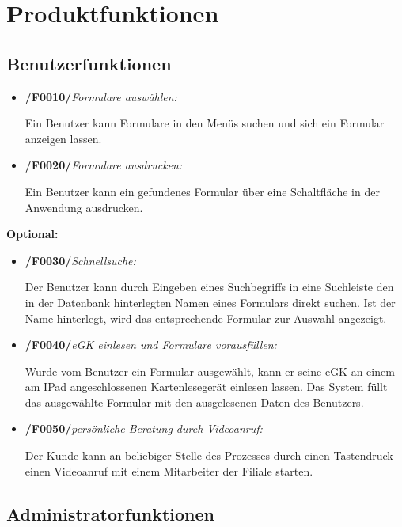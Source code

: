 \section{Produktfunktionen}


\subsection{Benutzerfunktionen}

\begin{itemize}
    \item \textbf{/F0010/}\textit{Formulare auswählen:} \par
    Ein Benutzer kann Formulare in den Menüs suchen und sich ein Formular anzeigen lassen.
    \item \textbf{/F0020/}\textit{Formulare ausdrucken:} \par
    Ein Benutzer kann ein gefundenes Formular über eine Schaltfläche in der Anwendung ausdrucken.
\end{itemize}
\vspace{1,5cm}
\textbf{Optional:}
    \begin{itemize}
        \item \textbf{/F0030/}\textit{Schnellsuche:} \par
        Der Benutzer kann durch Eingeben eines Suchbegriffs in eine Suchleiste den in der Datenbank hinterlegten Namen eines Formulars direkt suchen. Ist der Name hinterlegt, wird das entsprechende Formular zur Auswahl angezeigt.
        \item \textbf{/F0040/}\textit{eGK einlesen und Formulare vorausfüllen:} \par
        Wurde vom Benutzer ein Formular ausgewählt, kann er seine eGK an einem am IPad angeschlossenen Kartenlesegerät einlesen lassen. Das System füllt das ausgewählte Formular mit den ausgelesenen Daten des Benutzers.
        \item \textbf{/F0050/}\textit{persönliche Beratung durch Videoanruf:} \par
        Der Kunde kann an beliebiger Stelle des Prozesses durch einen Tastendruck einen Videoanruf mit einem Mitarbeiter der Filiale starten.
    \end{itemize}
    
\newpage

\subsection{Administratorfunktionen}

